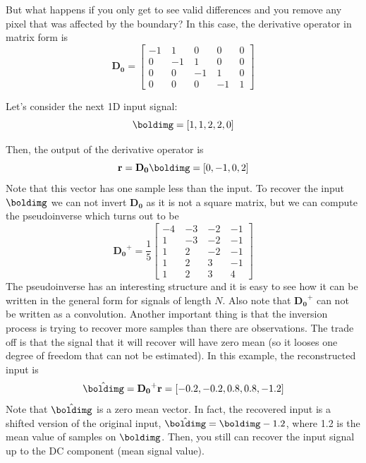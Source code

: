 But what happens if you only get to see valid differences and you remove any pixel that was affected by the boundary? In this case, the derivative operator in matrix form is
\begin{equation}
	\mathbf{D_0} =
	\begin{bmatrix}
		-1 ~ & 1 ~  & 0 ~  & 0~   & 0 \\
		0 ~  & -1 ~ & 1 ~  & 0 ~  & 0 \\
		0~   & 0 ~  & -1 ~ & 1 ~  & 0 \\
		0~   & 0 ~  & 0 ~  & -1 ~ & 1
	\end{bmatrix}
\end{equation}

Let's consider the next 1D input signal:
\begin{equation}
	\boldimg = \left[1, 1, 2, 2, 0\right]
\end{equation}

Then, the output of the derivative operator is
\begin{equation}
	\mathbf{r}=\mathbf{D_0} \boldimg=\left[0, -1, 0, 2\right]
\end{equation}
Note that this vector has one sample less than the input. To recover the input $\boldimg$ we can not invert $\mathbf{D_0}$ as it is not a square matrix, but we can compute the pseudoinverse which turns out to be
\begin{equation}
	\mathbf{D_0}^{+} = \frac{1}{5}
	\begin{bmatrix}
		-4 ~ & -3 ~ & -2~  & -1 \\
		1 ~  & -3 ~ & -2 ~ & -1 \\
		1~   & 2 ~  & -2 ~ & -1 \\
		1~   & 2 ~  & 3 ~  & -1 \\
		1~   & 2 ~  & 3 ~  & 4
	\end{bmatrix}
\end{equation}
The pseudoinverse has an interesting structure and it is easy to see how it can be written in the general form for signals of length $N$. Also note that $\mathbf{D_0}^{+}$ can not be written as a convolution.
Another important thing is that the inversion process is trying to recover more samples than there are observations. The trade off is that the signal that it will recover will have zero mean (so it looses one degree of freedom that can not be estimated). In this example, the reconstructed input is
\begin{equation}
	\hat{\boldimg} = \mathbf{D_0}^{+} \mathbf{r} =
	\left[-0.2, -0.2, 0.8, 0.8, -1.2 \right]
\end{equation}
Note that $\hat{\boldimg}$ is a zero mean vector. In fact, the recovered input is a shifted version of the original input, $\hat{\boldimg} = \boldimg - 1.2$, where 1.2 is the mean value of samples on $\boldimg$.
Then, you still can recover the input signal up to the DC component (mean signal value).


